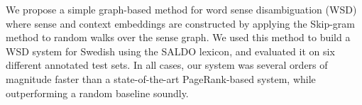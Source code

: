 We propose a simple graph-based method for word sense disambiguation (WSD) where sense and context embeddings are constructed by applying the Skip-gram method to random walks over the sense graph. We used this method to build a WSD system for Swedish using the SALDO lexicon, and evaluated it on six different annotated test sets. In all cases, our system was several orders of magnitude faster than a state-of-the-art PageRank-based system, while outperforming a random baseline soundly.
